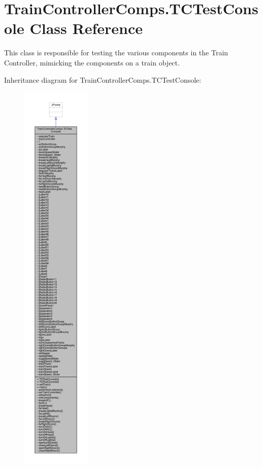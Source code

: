\hypertarget{classTrainControllerComps_1_1TCTestConsole}{}\section{Train\+Controller\+Comps.\+T\+C\+Test\+Console Class Reference}
\label{classTrainControllerComps_1_1TCTestConsole}


This class is responsible for testing the various components in the Train Controller, mimicking the components on a train object.  




Inheritance diagram for Train\+Controller\+Comps.\+T\+C\+Test\+Console\+:
\nopagebreak
\begin{figure}[H]
\begin{center}
\leavevmode
\includegraphics[height=550pt]{classTrainControllerComps_1_1TCTestConsole__inherit__graph}
\end{center}
\end{figure}


